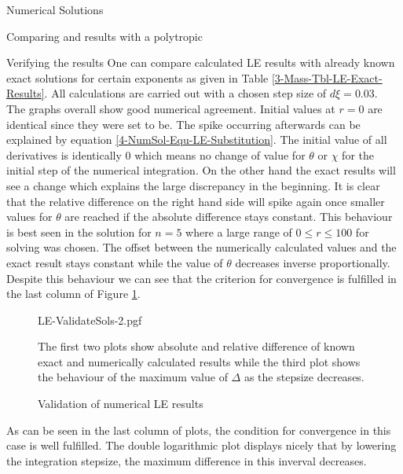 \begin{section}{Numerical Solutions}
\begin{subsection}{Comparing  and  results with a polytropic }
\begin{figure}[H]
\end{figure}
\end{subsection}
%
%
\begin{subsection}{Verifying the results}
\label{4-NumSol-Sec-Verifiying-the-results}
One can compare calculated \ac{LE} results with already known exact  solutions for certain exponents as given in Table \ref{3-Mass-Tbl-LE-Exact-Results}. 
All calculations are carried out with a chosen step size of $d\xi=0.03$.\\
The graphs overall show good numerical agreement. 
Initial values at $r=0$ are identical since they were set to be. 
The spike occurring afterwards can be explained by equation \eqref{4-NumSol-Equ-LE-Substitution}. 
The initial value of all derivatives is identically $0$ which means no change of value for $\theta$ or $\chi$ for the initial step of the numerical integration. 
On the other hand the exact results will see a change which explains the large discrepancy in the beginning.
It is clear that the relative difference on the right hand side will spike again once smaller values for $\theta$ are reached if the absolute difference stays constant. 
This behaviour is best seen in the solution for $n=5$ where a large range of $0\leq r\leq100$ for solving was chosen. 
The offset between the numerically calculated values and the exact result stays constant while the value of $\theta$ decreases inverse proportionally.
Despite this behaviour we can see that the criterion for convergence is fulfilled in the last column of Figure \ref{4-NumSol-Plt-ValidateLEResults}.
\begin{figure}[H]
	\centering
	{LE-ValidateSols-2.pgf}
	\caption{Validation of numerical LE results}
	The first two plots show absolute and relative difference of known exact and numerically calculated results while the third plot shows the behaviour of the maximum value of $\Delta$ as the stepsize decreases.
	\label{4-NumSol-Plt-ValidateLEResults}
\end{figure}\noindent
As can be seen in the last column of plots, the condition for convergence in this case is well fulfilled. 
The double logarithmic plot displays nicely that by lowering the integration stepsize, the maximum difference in this inverval decreases.

\end{subsection}
\end{section}
